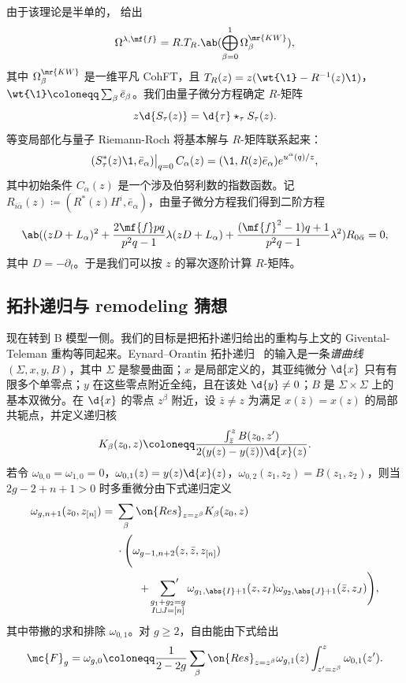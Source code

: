 由于该理论是半单的， 给出
\[ \Omega^{\lambda,\mf{f}} = R.T_R.\ab(\bigoplus_{\beta=0}^1 \Omega^{\mr{KW}}_{\beta}), \]
其中 \(\Omega^{\mr{KW}}_{\beta}\) 是一维平凡 CohFT，且 \(T_R(z) = z(\wt{\1}-R^{-1}(z)\1)\)，\(\wt{\1} \coloneqq \sum_{\beta}\bar{e}_{\beta}\)。我们由量子微分方程确定 \(R\)-矩阵
\[ z \d{S_{\tau}(z)} = \d{\tau} \star_{\tau} S_{\tau}(z). \]
等变局部化与量子 Riemann-Roch 将基本解与 \(R\)-矩阵联系起来：
\[ (S^*_{\tau}(z)\1, \bar{e}_{\alpha})\big|_{q=0}\, C_{\alpha}(z) = (\1, R(z)\bar{e}_{\alpha})e^{u^{\alpha}(q)/z}, \]
其中初始条件 \(C_{\alpha}(z)\) 是一个涉及伯努利数的指数函数。记 \(R_{i\bar{\alpha}}(z) \coloneqq (R^*(z)H^i, \bar{e}_{\alpha})\)，由量子微分方程我们得到二阶方程
\[ \ab( (zD+L_{\alpha})^2 + \frac{2\mf{f}pq}{p^2q-1}\lambda(zD+L_{\alpha}) + \frac{(\mf{f}^2-1)q+1}{p^2q-1}\lambda^2 )R_{0\bar{\alpha}} = 0, \]
其中 \(D = -\partial_t\)。于是我们可以按 \(z\) 的幂次逐阶计算 \(R\)-矩阵。

\subsection{拓扑递归与 remodeling 猜想}%
\label{sub:Topological recursion and the remodeling conjecture}

现在转到 B 模型一侧。我们的目标是把拓扑递归给出的重构与上文的 Givental-Teleman 重构等同起来。Eynard--Orantin 拓扑递归~\cite{EO2007} 的输入是一条\textit{谱曲线} \((\Sigma,x,y,B)\)，其中 \(\Sigma\) 是黎曼曲面；\(x\) 是局部定义的，其亚纯微分 \(\d{x}\) 只有有限多个单零点；\(y\) 在这些零点附近全纯，且在该处 \(\d{y} \neq 0\)；\(B\) 是 \(\Sigma \times \Sigma\) 上的基本双微分。在 \(\d{x}\) 的零点 \(z^{\beta}\) 附近，设 \(\bar{z} \neq z\) 为满足 \(x(\bar{z}) = x(z)\) 的局部共轭点，并定义递归核
\[ K_{\beta}(z_0,z) \coloneqq \frac{\int_{\bar{z}}^z B(z_0,z')}{2(y(z)-y(\bar{z}))\d{x}(z)}. \]
若令 \(\omega_{0,0} = \omega_{1,0} = 0\)，\(\omega_{0,1}(z) = y(z)\d{x}(z)\)，\(\omega_{0,2}(z_1,z_2) = B(z_1,z_2)\)，则当 \(2g-2+n+1 > 0\) 时多重微分由下式递归定义
\begin{align*}
    \omega_{g,n+1}(z_0,z_{[n]}) ={}& \sum_{\beta}\on{Res}_{z = z^{\beta}} K_{\beta}(z_0,z) \\
    &\cdot \Bigg( \omega_{g-1,n+2}(z,\bar{z},z_{[n]}) \\
    &\qquad + \sideset{}{'}\sum_{\substack{g_1+g_2 = g \\ I \sqcup J = [n]}}\omega_{g_1,\abs{I}+1}(z,z_I)\omega_{g_2,\abs{J}+1}(\bar{z},z_J)\Bigg),
\end{align*}
其中带撇的求和排除 \(\omega_{0,1}\)。对 \(g \geq 2\)，自由能由下式给出
\[ \mc{F}_g = \omega_{g,0} \coloneqq \frac{1}{2-2g}\sum_{\beta}\on{Res}_{z=z^{\beta}}\omega_{g,1}(z)\int_{z'=z^{\beta}}^z \omega_{0,1}(z'). \]

